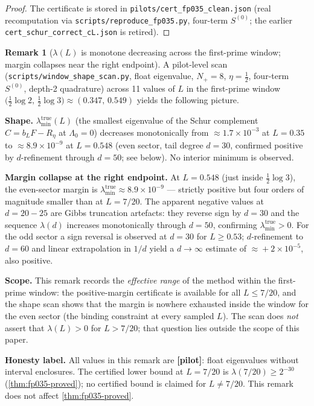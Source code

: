 \documentclass[12pt,a4paper]{amsart}
\theoremstyle{plain}
\theoremstyle{definition}
\newtheorem{remark}[theorem]{Remark}
\begin{document}
\begin{proof}
The certificate is stored in \texttt{pilots/cert\_fp035\_clean.json}
(real recomputation via \texttt{scripts/reproduce\_fp035.py}, four-term
$S^{(0)}$; the earlier \texttt{cert\_schur\_correct\_cL.json} is retired).
\end{proof}

\begin{remark}[$\lambda(L)$ is monotone decreasing across the first-prime window;
               margin collapses near the right endpoint]
\label{rem:window-shape}
A pilot-level scan (\texttt{scripts/window\_shape\_scan.py}, float eigenvalue,
$N_+=8$, $\eta=\tfrac12$, four-term $S^{(0)}$, depth-2 quadrature) across
11 values of $L$ in the first-prime window
$\bigl(\tfrac12\log 2,\,\tfrac12\log 3\bigr)\approx(0.347,\,0.549)$ yields
the following picture.

\smallskip\noindent
\textbf{Shape.}  $\lambda_{\min}^{\mathrm{true}}(L)$ (the smallest eigenvalue of
the Schur complement $C = b_L F - R_\eta$ at $\Lambda_0 = 0$) decreases
monotonically from $\approx\!1.7\times10^{-3}$ at $L=0.35$ to
$\approx\!8.9\times10^{-9}$ at $L=0.548$ (even sector, tail degree $d=30$,
confirmed positive by $d$-refinement through $d=50$; see below).
No interior minimum is observed.

\smallskip\noindent
\textbf{Margin collapse at the right endpoint.}
At $L = 0.548$ (just inside $\tfrac12\log 3$), the even-sector margin is
$\lambda_{\min}^{\mathrm{true}} \approx 8.9\times 10^{-9}$ --- strictly
positive but four orders of magnitude smaller than at $L=7/20$.
The apparent negative values at $d=20{-}25$ are Gibbs truncation artefacts:
they reverse sign by $d=30$ and the sequence $\lambda(d)$ increases
monotonically through $d=50$, confirming $\lambda_{\min}^{\mathrm{true}}>0$.
For the odd sector a sign reversal is observed at $d=30$ for $L\geq 0.53$;
$d$-refinement to $d=60$ and linear extrapolation in $1/d$ yield a
$d\to\infty$ estimate of $\approx\!+2\times10^{-5}$, also positive.

\smallskip\noindent
\textbf{Scope.}
This remark records the \emph{effective range} of the method within the
first-prime window: the positive-margin certificate is available for all
$L\leq 7/20$, and the shape scan shows that the margin is nowhere exhausted
inside the window for the even sector (the binding constraint at every
sampled $L$).  The scan does \emph{not} assert that $\lambda(L)>0$ for
$L>7/20$; that question lies outside the scope of this paper.

\smallskip\noindent
\textbf{Honesty label.}
All values in this remark are \textbf{[pilot]}: float eigenvalues without
interval enclosures.  The certified lower bound at $L=7/20$ is
$\lambda(7/20)\geq 2^{-30}$ (\cref{thm:fp035-proved}); no certified bound is
claimed for $L\neq 7/20$.  This remark does not affect \cref{thm:fp035-proved}.
\end{remark}
\end{document}
